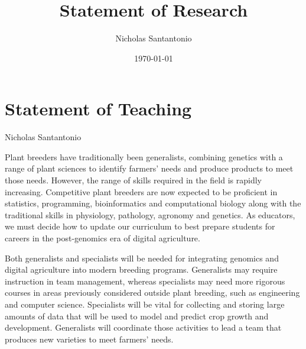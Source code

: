 \documentclass[11pt]{article}
\title{Statement of Research}
\author{Nicholas Santantonio}
\date{\today}
\begin{document}
\section*{\centering Statement of Teaching}
\begin{center} Nicholas Santantonio \end{center}

\noindent Plant breeders have traditionally been generalists, combining genetics with a range of plant sciences to identify farmers' needs and produce products to meet those needs. However, the range of skills required in the field is rapidly increasing. Competitive plant breeders are now expected to be proficient in statistics, programming, bioinformatics and computational biology along with the traditional skills in physiology, pathology, agronomy and genetics. As educators, we must decide how to update our curriculum to best prepare students for careers in the post-genomics era of digital agriculture. 

Both generalists and specialists will be needed for integrating genomics and digital agriculture into modern breeding programs. Generalists may require instruction in team management, whereas specialists may need more rigorous courses in areas previously considered outside plant breeding, such as engineering and computer science. Specialists will be vital for collecting and storing large amounts of data that will be used to model and predict crop growth and development. Generalists will coordinate those activities to lead a team that produces new varieties to meet farmers' needs. %


\end{document}
